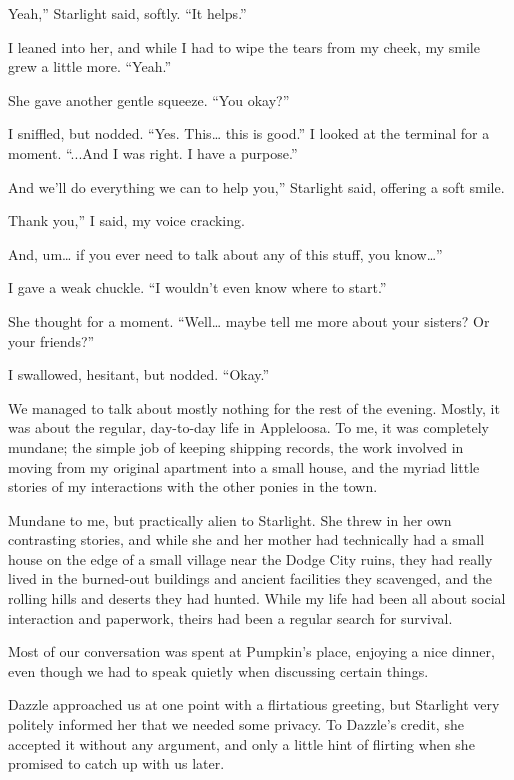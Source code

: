 \leavevmode{}Yeah,” Starlight said, softly. “It helps.”

I leaned into her, and while I had to wipe the tears from my cheek, my smile grew a little more. “Yeah.”

She gave another gentle squeeze. “You okay?”

I sniffled, but nodded. “Yes. This… this is good.” I looked at the terminal for a moment. “...And I was right. I have a purpose.”

\leavevmode{}And we’ll do everything we can to help you,” Starlight said, offering a soft smile.

\leavevmode{}Thank you,” I said, my voice cracking.

\leavevmode{}And, um… if you ever need to talk about any of this stuff, you know…”

I gave a weak chuckle. “I wouldn’t even know where to start.”

She thought for a moment. “Well… maybe tell me more about your sisters? Or your friends?”

I swallowed, hesitant, but nodded. “Okay.”

{\br}%
We managed to talk about mostly nothing for the rest of the evening. Mostly, it was about the regular, day-to-day life in Appleloosa. To me, it was completely mundane; the simple job of keeping shipping records, the work involved in moving from my original apartment into a small house, and the myriad little stories of my interactions with the other ponies in the town.

Mundane to me, but practically alien to Starlight. She threw in her own contrasting stories, and while she and her mother had technically had a small house on the edge of a small village near the Dodge City ruins, they had really lived in the burned-out buildings and ancient facilities they scavenged, and the rolling hills and deserts they had hunted. While my life had been all about social interaction and paperwork, theirs had been a regular search for survival.

Most of our conversation was spent at Pumpkin’s place, enjoying a nice dinner, even though we had to speak quietly when discussing certain things.

Dazzle approached us at one point with a flirtatious greeting, but Starlight very politely informed her that we needed some privacy. To Dazzle’s credit, she accepted it without any argument, and only a little hint of flirting when she promised to catch up with us later.

